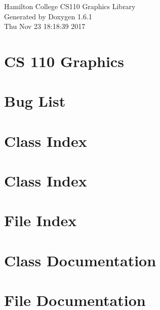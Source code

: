 \documentclass[a4paper]{book}
\begin{document}
\hypersetup{pageanchor=false}
\begin{titlepage}
\vspace*{7cm}
\begin{center}
{\Large Hamilton College CS110 Graphics Library }\\
\vspace*{1cm}
{\large Generated by Doxygen 1.6.1}\\
\vspace*{0.5cm}
{\small Thu Nov 23 18:18:39 2017}\\
\end{center}
\end{titlepage}
\clearemptydoublepage
{}
\tableofcontents
\clearemptydoublepage
{}
\hypersetup{pageanchor=true}
\chapter{CS 110 Graphics}
\label{index}\hypertarget{index}{}
\chapter{Bug List}
\label{bug}
\hypertarget{bug}{}

\chapter{Class Index}

\chapter{Class Index}

\chapter{File Index}

\chapter{Class Documentation}













\chapter{File Documentation}

\printindex
\end{document}
